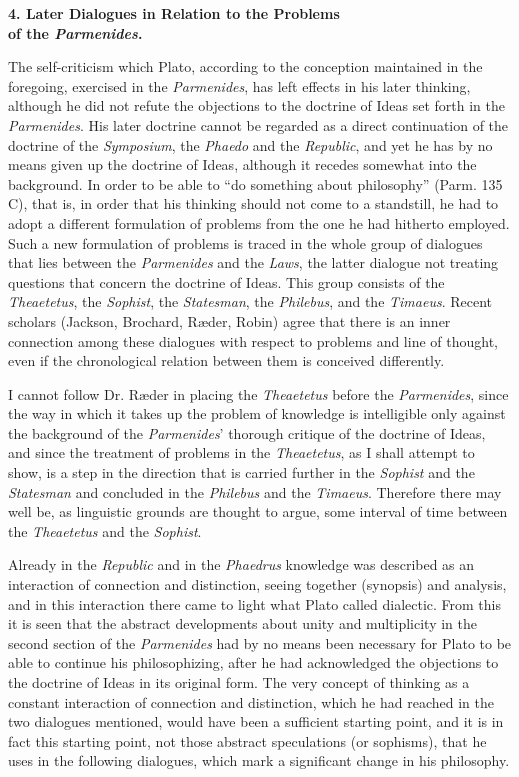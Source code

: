 \documentclass[12pt,a4paper,openany]{book}
\newcommand{\opage}[1]{\marginnote{\footnotesize\textit{[#1]}}}
\newcommand{\chaphead}[1]{\par\bigskip\phantomsection\begin{center}\bfseries #1\end{center}\medskip\ignorespaces}
\begin{document}
\chaphead{4. Later Dialogues in Relation to the Problems\\ of the \textit{Parmenides}.}


The self-criticism which Plato, according to the conception maintained
in the foregoing, exercised in the \textit{Parmenides}, has left
\setcounter{footnote}{0}%
\opage{54}effects in his later thinking, although he did not
refute the objections to the doctrine of Ideas set forth in the \textit{Parmenides}.
His later doctrine cannot be regarded as a
direct continuation of the doctrine of the \textit{Symposium}, the \textit{Phaedo}
and the \textit{Republic}, and yet he has by no means given up the doctrine of Ideas,
although it recedes somewhat into the background.  In order to
be able to ``do something about philosophy'' (Parm. 135 C), that is, in order
that his thinking should not come to a standstill, he had to adopt a different
formulation of problems from the one he had hitherto employed.  Such
a new formulation of problems is traced in the whole group of
dialogues that lies between the \textit{Parmenides} and the \textit{Laws},
the latter dialogue not treating questions that concern
the doctrine of Ideas.  This group consists of the \textit{Theaetetus}, the \textit{Sophist},
the \textit{Statesman}, the \textit{Philebus}, and the \textit{Timaeus}.  Recent scholars
(Jackson, Brochard, Ræder, Robin) agree that
there is an inner connection among these dialogues
with respect to problems and line of thought, even if
the chronological relation between them is conceived differently.

I cannot follow Dr. Ræder in placing the \textit{Theaetetus}
before the \textit{Parmenides}, since the way in which it takes up
the problem of knowledge is intelligible only against the background
of the \textit{Parmenides}' thorough critique of the doctrine of Ideas, and since the treatment of problems
in the \textit{Theaetetus}, as I shall attempt to
show, is a step in the direction that is carried further in the \textit{Sophist}
and the \textit{Statesman} and concluded in the \textit{Philebus} and the \textit{Timaeus}.
Therefore there may well be, as linguistic grounds are thought
to argue, some interval of time between the \textit{Theaetetus}
and the \textit{Sophist}.

Already in the \textit{Republic} and in the \textit{Phaedrus} knowledge was described
as an interaction of connection and distinction,
seeing together (synopsis) and analysis, and in this interaction
there came to light what Plato called dialectic.
\setcounter{footnote}{0}%
\opage{55}From this it is seen that the abstract developments about unity and multiplicity
in the second section of the \textit{Parmenides} had by no means
been necessary for Plato to be able to continue his
philosophizing, after he had acknowledged the objections
to the doctrine of Ideas in its original form.  The very concept
of thinking as a constant interaction of connection
and distinction, which he had reached in the two dialogues mentioned,
would have been a sufficient starting point, and it
is in fact this starting point, not those abstract
speculations (or sophisms), that he uses in the following
dialogues, which mark a significant change in his
philosophy.
\end{document}
